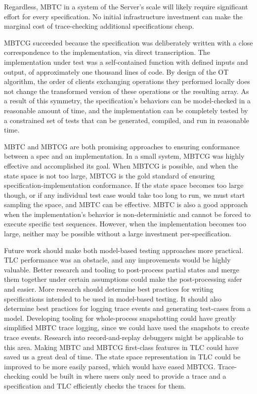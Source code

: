 \documentclass{vldb}
\begin{document}
Regardless, MBTC in a system of the Server's scale will likely require significant effort for every specification.
No initial infrastructure investment can make the marginal cost of trace-checking additional specifications cheap.

MBTCG succeeded because the specification was deliberately written with a close correspondence to the implementation, via direct transcription.
The implementation under test was a self-contained function with defined inputs and output, of approximately one thousand lines of code. 
By design of the OT algorithm, the order of clients exchanging operations they performed locally does not change the transformed version of these operations or the resulting array.
As a result of this symmetry, the specification's behaviors can be model-checked in a reasonable amount of time, and the implementation can be completely tested by a constrained set of tests that can be generated, compiled, and run in reasonable time.

MBTC and MBTCG are both promising approaches to ensuring conformance between a spec and an implementation.
In a small system, MBTCG was highly effective and accomplished its goal.
When MBTCG is possible, and when the state space is not too large, MBTCG is the gold standard of ensuring specification-implementation conformance.
If the state space becomes too large though, or if any individual test case would take too long to run, we must start sampling the space, and MBTC can be effective.
MBTC is also a good approach when the implementation's behavior is non-deterministic and cannot be forced to execute specific test sequences.
However, when the implementation becomes too large, neither may be possible without a large investment per-specification.

Future work should make both model-based testing approaches more practical.
TLC performance was an obstacle, and any improvements would be highly valuable.
Better research and tooling to post-process partial states and merge them together under certain assumptions could make the post-processing safer and easier.
More research should determine best practices for writing specifications intended to be used in model-based testing.
It should also determine best practices for logging trace events and generating test-cases from a model.
Developing tooling for whole-process snapshotting could have greatly simplified MBTC trace logging, since we could have used the snapshots to create trace events.
Research into record-and-replay debuggers \cite{OCallahan17RRDebugger} might be applicable to this area.
Making MBTC and MBTCG first-class features in TLC could have saved us a great deal of time.
The state space representation in TLC could be improved to be more easily parsed, which would have eased MBTCG.
Trace-checking could be built in where users only need to provide a trace and a specification and TLC efficiently checks the traces for them.
\end{document}
